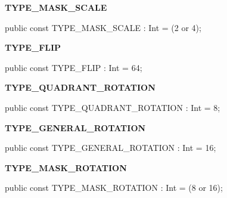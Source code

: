 \documentclass{report}
\newif\ifpdf
\begin{document}
\begin{list}{}
\begin{flushleft}
\ifpdf
\end{flushleft}
\fi


\par  \label{NewPascal.GUI.Geom.AffineTransform-TYPE_MASK_SCALE}
\item[\textbf{TYPE{\_}MASK{\_}SCALE}\hfill]
\ifpdf
\begin{flushleft}
\fi
\begin{ttfamily}
public const TYPE{\_}MASK{\_}SCALE          : Int = (2 or 4);\end{ttfamily}

\ifpdf
\end{flushleft}
\fi


\par  \label{NewPascal.GUI.Geom.AffineTransform-TYPE_FLIP}
\item[\textbf{TYPE{\_}FLIP}\hfill]
\ifpdf
\begin{flushleft}
\fi
\begin{ttfamily}
public const TYPE{\_}FLIP                : Int = 64;\end{ttfamily}

\ifpdf
\end{flushleft}
\fi


\par  \label{NewPascal.GUI.Geom.AffineTransform-TYPE_QUADRANT_ROTATION}
\item[\textbf{TYPE{\_}QUADRANT{\_}ROTATION}\hfill]
\ifpdf
\begin{flushleft}
\fi
\begin{ttfamily}
public const TYPE{\_}QUADRANT{\_}ROTATION   : Int = 8;\end{ttfamily}

\ifpdf
\end{flushleft}
\fi


\par  \label{NewPascal.GUI.Geom.AffineTransform-TYPE_GENERAL_ROTATION}
\item[\textbf{TYPE{\_}GENERAL{\_}ROTATION}\hfill]
\ifpdf
\begin{flushleft}
\fi
\begin{ttfamily}
public const TYPE{\_}GENERAL{\_}ROTATION    : Int = 16;\end{ttfamily}

\ifpdf
\end{flushleft}
\fi


\par  \label{NewPascal.GUI.Geom.AffineTransform-TYPE_MASK_ROTATION}
\item[\textbf{TYPE{\_}MASK{\_}ROTATION}\hfill]
\ifpdf
\begin{flushleft}
\fi
\begin{ttfamily}
public const TYPE{\_}MASK{\_}ROTATION       : Int = (8 or 16);\end{ttfamily}


\end{flushleft}
\end{list}
\end{document}
